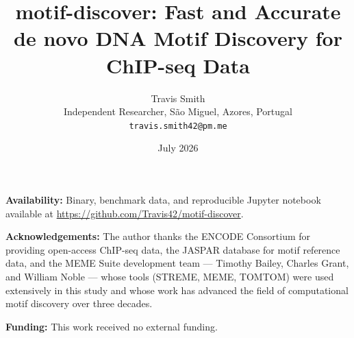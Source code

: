 \documentclass[11pt,a4paper]{article}
\title{motif-discover: Fast and Accurate de novo DNA Motif Discovery for ChIP-seq Data}
\author{Travis Smith\\
\small Independent Researcher, S\~ao Miguel, Azores, Portugal\\
\texttt{travis.smith42@pm.me}}
\date{July 2026}
\begin{document}
\maketitle







\vspace{1em}
\noindent\textbf{Availability:} Binary, benchmark data, and reproducible Jupyter notebook available at \url{https://github.com/Travis42/motif-discover}.

\vspace{1em}
\noindent\textbf{Acknowledgements:} The author thanks the ENCODE Consortium for providing open-access ChIP-seq data, the JASPAR database for motif reference data, and the MEME Suite development team --- Timothy Bailey, Charles Grant, and William Noble --- whose tools (STREME, MEME, TOMTOM) were used extensively in this study and whose work has advanced the field of computational motif discovery over three decades.

\vspace{1em}
\noindent\textbf{Funding:} This work received no external funding.




\clearpage
\appendix
\renewcommand{\thesection}{\Alph{section}}

\end{document}
